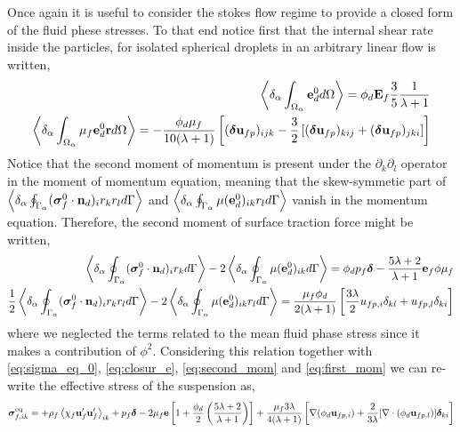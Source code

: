 Once again it is useful to consider the stokes flow regime to provide a closed form of the fluid phese stresses. 
To that end notice first that the internal shear rate inside the particles, for isolated spherical droplets in an arbitrary linear flow  is written, 
\begin{align}
    \left<\delta_\alpha \int_{\Omega_\alpha} \textbf{e}_d^0 d\Omega\right>
    = 
    \phi_d 
    \textbf{E}_f
    \frac{3}{5}\frac{1}{\lambda+1}
    \\
    \left<\delta_\alpha \int_{\Omega_\alpha} \mu_f \textbf{e}_d^0\textbf{r}  d\Omega\right>
    = 
    - \frac{\phi_d\mu_f}{10(\lambda+1)}
    \left[
        (\bm\delta \textbf{u}_{fp})_{ijk}
        - \frac{3}{2}
        \left[
            (\bm\delta \textbf{u}_{fp})_{kij}
            + (\bm\delta \textbf{u}_{fp})_{jki}
        \right]
    \right]
    \label{eq:closur_e}
\end{align}
Notice that the second moment of momentum is present under the $\partial_k\partial_l$ operator in the moment of momentum equation, meaning that the skew-symmetic part of $\left<\delta_\alpha \oint_{\Gamma_\alpha} (\bm{\sigma}_f^0 \cdot \textbf{n}_d)_ir_kr_l d\Gamma\right> $ and $\left<\delta_\alpha \oint_{\Gamma_\alpha} {\mu(\textbf{e}_d^0)_{ik} r_l} d\Gamma\right>$ vanish in the momentum equation. 
Therefore, the second moment of surface traction force might be written, 
\begin{align*}
    \left<\delta_\alpha \oint_{\Gamma_\alpha} (\bm{\sigma}_f^0 \cdot \textbf{n}_d)_ir_k d\Gamma\right> -
    2\left<\delta_\alpha \oint_{\Gamma_\alpha} {\mu(\textbf{e}_d^0)_{ik}} d\Gamma\right> 
    = 
    \phi_d p_f\bm\delta
    - \frac{5\lambda +2}{\lambda +1}
    \textbf{e}_f \phi \mu_f
    \\
    \frac{1}{2}\left<\delta_\alpha \oint_{\Gamma_\alpha} (\bm{\sigma}_f^0 \cdot \textbf{n}_d)_ir_kr_l d\Gamma\right> -
    2\left<\delta_\alpha \oint_{\Gamma_\alpha} {\mu(\textbf{e}_d^0)_{ik} r_l} d\Gamma\right> 
    = 
    \frac{\mu_f\phi_d}{2(\lambda +1) }
    \left[
        \frac{3\lambda}{2} 
        u_{fp,i}\delta_{kl}
        +  u_{fp,l}\delta_{ki}
    \right]
\end{align*}
where we neglected the terms related to the mean fluid phase stress since it makes a contribution of $\mathcal{\phi^2}$\citet{jackson1997locally}.
Considering this relation together with \ref{eq:sigma_eq_0}, \ref{eq:closur_e}, \ref{eq:second_mom} and \ref{eq:first_mom} we can re-write the effective stress of the suspension as, 
\begin{align*}
    \bm{\sigma}^\text{eq}_{f,ik} =
    + \rho_f\left<\chi_f\textbf{u}_f'\textbf{u}_f'\right>_{ik} 
    + p_f \bm\delta
    - 2 \mu_f \textbf{e}\left[
        1
        +\frac{\phi_d}{2}\left(
            \frac{5\lambda +2}{\lambda +1}
        \right)
    \right]
    + 
    \frac{\mu_f 3\lambda}{4(\lambda +1) }
    \left[
        \mathbf{\nabla} (\phi_d\textbf{u}_{fp,i})
        +  
        \frac{2}{3\lambda} 
        [\mathbf{\nabla}\cdot (\phi_d\textbf{u}_{fp,l})]\bm\delta_{ki}
    \right]
\end{align*} 

